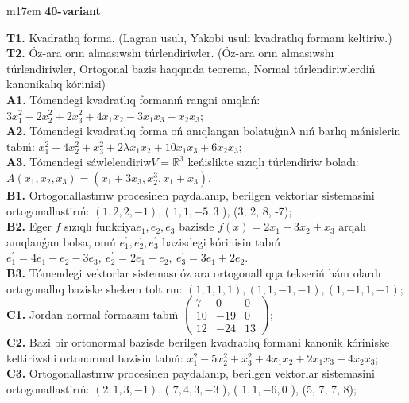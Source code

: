 \documentclass{article}
\begin{document}
\begin{tabular}{m{17cm}}
\textbf{40-variant}
\newline

\textbf{T1.} Kvadratlıq forma. (Lagran usulı, Yakobi usulı kvadratlıq formanı keltiriw.) \\
\textbf{T2.} Óz-ara orın almasıwshı túrlendiriwler. (Óz-ara orın almasıwshı túrlendiriwler,  Ortogonal bazis haqqında teorema,  Normal túrlendiriwlerdiń kanonikalıq kórinisi) \\
\textbf{A1.} Tómendegi kvadratlıq formanıń rangni anıqlań: \(3x_{1}^{2} - 2x_{2}^{2} + 2x_{3}^{2} + 4x_{1}x_{2} - 3x_{1}x_{3} - x_{2}x_{3}\); \\
\textbf{A2.} Tómendegi kvadratlıq forma oń anıqlangan bolatuģın\(\lambda\) nıń barlıq mánislerin tabıń: \(x_{1}^{2} + 4x_{2}^{2} + x_{3}^{2} + 2\lambda x_{1}x_{2} + 10x_{1}x_{3} + 6x_{2}x_{3}\); \\
\textbf{A3.} Tómendegi sáwlelendiriw\(V = \mathbb{R}^{3}\) keńislikte sızıqlı túrlendiriw boladı: \(A\left( x_{1},x_{2},x_{3} \right) = \left( x_{1} + 3x_{3},x_{2}^{3},x_{1} + x_{3} \right)\). \\
\textbf{B1.} Ortogonallastırıw procesinen paydalanıp, berilgen vektorlar sistemasini ortogonallastirıń: \((1,2,2, - 1)\), ( \(1,1, - 5,3\) ), (3, 2, 8, -7); \\
\textbf{B2.} Eger \(f\) sızıqlı funkciya\(e_{1},e_{2},e_{3}\) bazisde \(f(x) = 2x_{1} - 3x_{2} + x_{3}\) arqalı anıqlanǵan bolsa, onıń \(e_{1}^{'},e_{2}^{'},e_{3}^{'}\) bazisdegi kórinisin tabıń\(e_{1}^{'} = 4e_{1} - e_{2} - 3e_{3},\ e_{2}^{'} = 2e_{1} + e_{2},\ e_{3}^{'} = 3e_{1} + 2e_{2}\). \\
\textbf{B3.} Tómendegi vektorlar sisteması óz ara ortogonallıqqa tekseriń hám olardı ortogonallıq baziske shekem toltırın: \((1,1,1,1),(1,1, - 1, - 1),(1, - 1,1, - 1)\); \\
\textbf{C1.} Jordan normal formasını tabıń \(\begin{pmatrix} 7 & 0 & 0 \\ 10 & - 19 & 0 \\ 12 & - 24 & 13 \end{pmatrix}\); \\
\textbf{C2.} Bazi bir ortonormal bazisde berilgen kvadratlıq formani kanonik kóriniske keltiriwshi ortonormal bazisin tabıń: \(x_{1}^{2} - 5x_{2}^{2} + x_{3}^{2} + 4x_{1}x_{2} + 2x_{1}x_{3} + 4x_{2}x_{3}\); \\
\textbf{C3.} Ortogonallastırıw procesinen paydalanıp, berilgen vektorlar sistemasini ortogonallastirıń: \((2,1,3, - 1)\), ( \(7,4,3, - 3\) ), ( \(1,1, - 6,0\) ), (5, 7, 7, 8); \\

\end{tabular}
\vspace{1cm}
\end{document}
